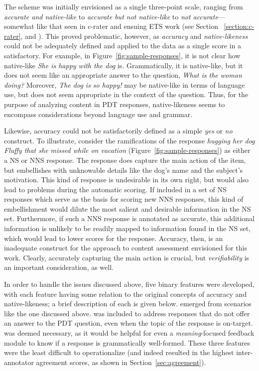 The scheme was initially envisioned as a single three-point scale, ranging from \textit{accurate and native-like} to \textit{accurate but not native-like} to \textit{not accurate}---somewhat like that seen in c-rater and ensuing ETS work (see Section~
\ref{section:c-rater}, and \citealp[][]{leacock:chodorow:03,somasundaran:chodorow:14}).
This proved problematic, however, as \textit{accuracy} and \textit{native-likeness} could not be adequately defined and applied to the data as a single score in a satisfactory.
For example, in Figure~\ref{fig:sample-responses}, it is not clear how native-like \textit{She is happy with the dog} is.  Grammatically, it is native-like, but it does not seem like an appropriate answer to the question, \textit{What is the woman doing?} Moreover, \textit{The dog is so happy!} may be native-like in terms of language use, but does not seem appropriate in the context of the question. Thus, for the purpose of analyzing content in PDT responses, native-likeness seems to encompass considerations beyond language use and grammar. 

Likewise, accuracy could not be satisfactorily defined as a simple \textit{yes} or \textit{no} construct. To illustrate, consider the ramifications of the response \textit{hugging her dog Fluffy that she missed while on vacation} (Figure~\ref{fig:sample-responses}) as either a NS or NNS response. The response does capture the main action of the item, but embellishes with unknowable details like the dog's name and the subject's motivation. This kind of response is undesirable in its own right, but would also lead to problems during the automatic scoring. If included in a set of NS responses which serve as the basis for scoring new NNS responses, this kind of embellishment would dilute the most salient and desirable information in the NS set. Furthermore, if such a NNS response is annotated as accurate, this additional information is unlikely to be readily mapped to information found in the NS set, which would lead to lower scores for the response. Accuracy, then, is an inadequate construct for the approach to content assessment envisioned for this work. Clearly, accurately capturing the main action is crucial, but \textit{verifiability} is an important consideration, as well.

In order to handle the issues discussed above, five binary features were developed, with each feature having some relation to the original concepts of accuracy and native-likeness; a brief description of each is given below.  emerged from scenarios like the one discussed above.  was included to address responses that do not offer an answer to the PDT question, even when the topic of the response is on-target.  was deemed necessary, as it would be helpful for even a \textit{meaning}-focused feedback module to know if a response is grammatically well-formed. These three features were the least difficult to operationalize (and indeed resulted in the highest inter-annotator agreement scores, as shown in Section~\ref{sec:agreement}).

